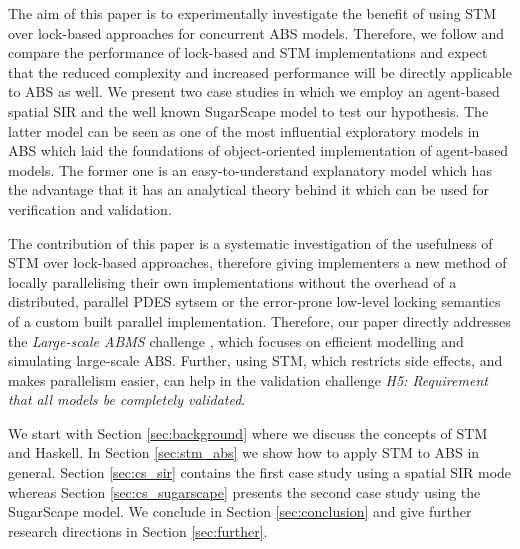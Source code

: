 \medskip

The aim of this paper is to experimentally investigate the benefit of using STM over lock-based approaches for concurrent ABS models. Therefore, we follow \cite{discolo_lock_2006} and compare the performance of lock-based and STM implementations and expect that the reduced complexity and increased performance will be directly applicable to ABS as well. We present two case studies in which we employ an agent-based spatial SIR \citep{macal_agent-based_2010, thaler_pure_2018} and the well known SugarScape \citep{epstein_growing_1996} model to test our hypothesis. The latter model can be seen as one of the most influential exploratory models in ABS which laid the foundations of object-oriented implementation of agent-based models. The former one is an easy-to-understand explanatory model which has the advantage that it has an analytical theory behind it which can be used for verification and validation. 

The contribution of this paper is a systematic investigation of the usefulness of STM over lock-based approaches, therefore giving implementers a new method of locally parallelising their own implementations without the overhead of a distributed, parallel PDES sytsem or the error-prone low-level locking semantics of a custom built parallel implementation. Therefore, our paper directly addresses the \textit{Large-scale ABMS} challenge \cite{macal_everything_2016}, which focuses on efficient modelling and simulating large-scale ABS. Further, using STM, which restricts side effects, and makes parallelism easier, can help in the validation challenge \cite{macal_everything_2016} \emph{H5: Requirement that all models be completely validated}.

We start with Section \ref{sec:background} where we discuss the concepts of STM and Haskell. In Section \ref{sec:stm_abs} we show how to apply STM to ABS in general. Section \ref{sec:cs_sir} contains the first case study using a spatial SIR mode whereas Section \ref{sec:cs_sugarscape} presents the second case study using the SugarScape model. We conclude in Section \ref{sec:conclusion} and give further research directions in Section \ref{sec:further}.
